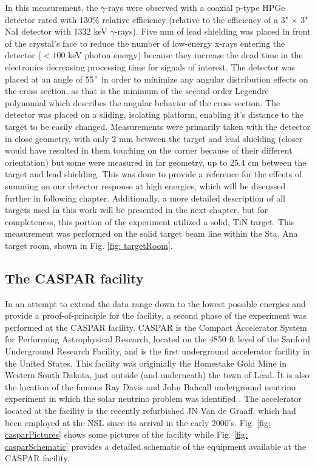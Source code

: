 In this measurement, the $\gamma$-rays were observed with a coaxial p-type HPGe detector rated with 130\% relative efficiency (relative to the efficiency of a 3" $\times$ 3" NaI detector with 1332 keV $\gamma$-rays). Five mm of lead shielding was placed in front of the crystal's face to reduce the number of low-energy x-rays entering the detector ($<100$ keV photon energy) because they increase the dead time in the electronics decreasing processing time for signals of interest. The detector was placed at an angle of 55$\degree$ in order to minimize any angular distribution effects on the cross section, as that is the minimum of the second order Legendre polynomial which describes the angular behavior of the cross section. The detector was placed on a sliding, isolating platform, enabling it's distance to the target to be easily changed. Measurements were primarily taken with the detector in close geometry, with only 2 mm between the target and lead shielding (closer would have resulted in them touching on the corner because of their different orientation) but some were measured in far geometry, up to 25.4 cm between the target and lead shielding. This was done to provide a reference for the effects of summing on our detector response at high energies, which will be discussed further in following chapter. Additionally, a more detailed description of all targets used in this work will be presented in the next chapter, but for completeness, this portion of the experiment utilized a solid, TiN target. This measurement was performed on the solid target beam line within the Sta. Ana target room, shown in Fig. \ref{fig: targetRoom}.


\subsection{The CASPAR facility}
\label{sec: caspar}

In an attempt to extend the data range down to the lowest possible energies and provide a proof-of-principle for the facility, a second phase of the experiment was performed at the CASPAR facility. CASPAR is the Compact Accelerator System for Performing Astrophysical Research, located on the 4850 ft level of the Sanford Underground Research Facility, and is the first underground accelerator facility in the United States. This facility was originially the Homestake Gold Mine in Western South Dakota, just outside (and underneath) the town of Lead. It is also the location of the famous Ray Davis and John Bahcall underground neutrino experiment in which the solar neutrino problem was identified \cite{Bahcall1976}. The accelerator located at the facility is the recently refurbished JN Van de Graaff, which had been employed at the NSL since its arrival in the early 2000's. Fig. \ref{fig: casparPictures} shows some pictures of the facility while Fig. \ref{fig: casparSchematic} provides a detailed schematic of the equipment available at the CASPAR facility. 


